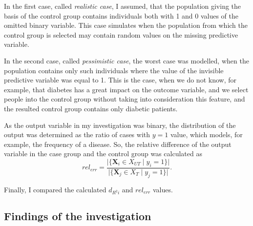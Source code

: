 		In the first case, called \textit{realistic case}, I assumed, that the population giving the basis of the control group contains individuals both with 1 and 0 values of the omitted binary variable. This case simulates when the population from which the control group is selected may contain random values on the missing predictive variable.
										
		In the second case, called \textit{pessimistic case}, the worst case was modelled, when the population contains only such individuals where the value of the invisible predictive variable was equal to 1. This is the case, when we do not know, for example, that diabetes has a great impact on the outcome variable, and we select people into the control group without taking into consideration this feature, and the resulted control group contains only diabetic patients.
										
		As the output variable in my investigation was binary, the distribution of the output was determined as the ratio of cases with $y=1$ value, which models, for example, the frequency of a disease. So, the relative difference of the output variable in the case group and the control group was calculated as		
		\begin{equation}
			rel_{err}= \frac{\lvert\{\textbf{X}_i \in X_{UT} \mid y_i = 1\}\rvert}{\lvert\{\textbf{X}_j \in X_T \mid y_j = 1\}\rvert}.
			\label{eq:reldiff}
		\end{equation}
										
		Finally, I compared the calculated $d_{R^{2}i}$ and $rel_{err}$ values.
										
		\subsection{Findings of the investigation}
		\label{res_missing}
										
										
